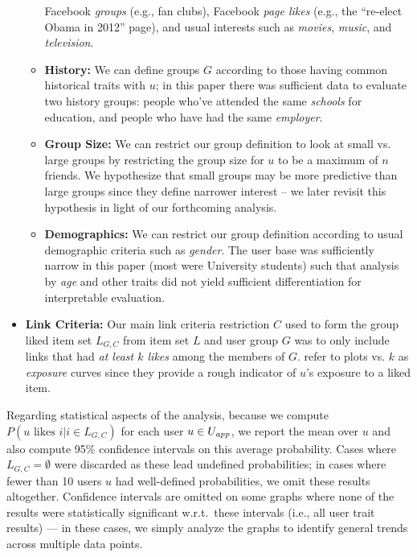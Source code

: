 \begin{itemize}
\begin{itemize}
      Facebook \textit{groups} (e.g., fan clubs), Facebook
      \textit{page likes} (e.g., the ``re-elect Obama in 2012'' page),
      and usual interests such as \textit{movies}, \textit{music}, and
      \textit{television}.
    \item \textbf{History:} We can define groups $G$ according to
      those having common historical traits with $u$; in this paper
      there was sufficient data to evaluate two history groups:
      people who've attended the same \textit{schools} for education,
      and people who have had the same \textit{employer}.
    \item \textbf{Group Size:} We can restrict our group definition
      to look at small vs. large groups by restricting the group
      size for $u$ to be a maximum of $n$ friends.  We hypothesize 
      that small groups may be more predictive than large groups since
      they define narrower interest -- we later revisit this hypothesis
      in light of our forthcoming analysis.
    \item \textbf{Demographics:} We can restrict our group definition
      according to usual demographic criteria such as \emph{gender}.
      The user base was sufficiently narrow in this paper (most were
      University students) such that analysis by \emph{age} and other
      traits did not yield sufficient differentiation for
      interpretable evaluation.%
  \end{itemize}
\item \textbf{Link Criteria:} Our main link criteria restriction $C$
      used to form the group liked item set $L_{G,C}$ from item set
      $L$ and user group $G$ was to only include links that had
      \emph{at least $k$ likes} among the members of $G$.  
      \cite{Romero2011hashtag} refer to plots vs. $k$ as
      \emph{exposure} curves since they provide a rough indicator of
      $u$'s exposure to a liked item.
\end{itemize}

Regarding statistical aspects of the analysis, 
because we compute $P(u \mbox{ likes } i | i \in L_{G,C})$ for each
user $u \in U_{\mathit{app}}$, we report the mean over $u$ and also compute 95\%
confidence intervals on this average probability.  Cases where
$L_{G,C} = \emptyset$ were discarded as these lead undefined
probabilities; in cases where fewer than 10 users $u$ had well-defined
probabilities, we omit these results altogether.  Confidence intervals
are omitted on some graphs where none of the results were
statistically significant w.r.t.\ these intervals (i.e., all user
trait results) --- in these cases,
we simply analyze the graphs to identify general trends across
multiple data points.

